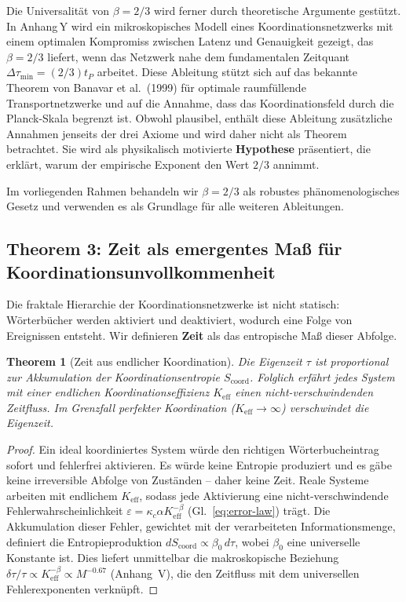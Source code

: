 \documentclass[12pt,a4paper]{article}
\newtheorem{theorem}{Theorem}[section]
\begin{document}
	Die Universalität von \(\beta = 2/3\) wird ferner durch theoretische Argumente gestützt.  In Anhang Y wird ein mikroskopisches Modell eines Koordinationsnetzwerks mit einem optimalen Kompromiss zwischen Latenz und Genauigkeit gezeigt, das \(\beta = 2/3\) liefert, wenn das Netzwerk nahe dem fundamentalen Zeitquant \(\Delta\tau_{\min} = (2/3) t_P\) arbeitet.  Diese Ableitung stützt sich auf das bekannte Theorem von Banavar et al.\ (1999) für optimale raumfüllende Transportnetzwerke und auf die Annahme, dass das Koordinationsfeld durch die Planck-Skala begrenzt ist.  Obwohl plausibel, enthält diese Ableitung zusätzliche Annahmen jenseits der drei Axiome und wird daher nicht als Theorem betrachtet.  Sie wird als physikalisch motivierte \textbf{Hypothese} präsentiert, die erklärt, warum der empirische Exponent den Wert \(2/3\) annimmt.
	
	Im vorliegenden Rahmen behandeln wir \(\beta = 2/3\) als robustes phänomenologisches Gesetz und verwenden es als Grundlage für alle weiteren Ableitungen.
	
	\subsection{Theorem 3: Zeit als emergentes Maß für Koordinationsunvollkommenheit}
	\label{subsec:time-emergence}
	
	Die fraktale Hierarchie der Koordinationsnetzwerke ist nicht statisch: Wörterbücher werden aktiviert und deaktiviert, wodurch eine Folge von Ereignissen entsteht.  Wir definieren
	\textbf{Zeit} als das entropische Maß dieser Abfolge.
	
	\begin{theorem}[Zeit aus endlicher Koordination]
		\label{thm:time}
		Die Eigenzeit \(\tau\) ist proportional zur Akkumulation der Koordinationsentropie \(S_{\mathrm{coord}}\).  Folglich erfährt jedes System mit einer endlichen Koordinationseffizienz \(K_{\mathrm{eff}}\) einen nicht-verschwindenden Zeitfluss.  Im Grenzfall perfekter Koordination (\(K_{\mathrm{eff}} \to \infty\)) verschwindet die Eigenzeit.
	\end{theorem}
	
	\begin{proof}
		Ein ideal koordiniertes System würde den richtigen Wörterbucheintrag sofort und fehlerfrei aktivieren.  Es würde keine Entropie produziert und es gäbe keine irreversible Abfolge von Zuständen – daher keine Zeit.  Reale Systeme arbeiten mit endlichem \(K_{\mathrm{eff}}\), sodass jede Aktivierung eine nicht-verschwindende Fehlerwahrscheinlichkeit \(\varepsilon = \kappa_c \alpha K_{\mathrm{eff}}^{-\beta}\) (Gl.~\ref{eq:error-law}) trägt.  Die Akkumulation dieser Fehler, gewichtet mit der verarbeiteten Informationsmenge, definiert die Entropieproduktion \(dS_{\mathrm{coord}} \propto \beta_0 \, d\tau\), wobei \(\beta_0\) eine universelle Konstante ist.  Dies liefert unmittelbar die makroskopische Beziehung \(\delta\tau/\tau \propto K_{\mathrm{eff}}^{-\beta} \propto M^{-0.67}\) (Anhang~V), die den Zeitfluss mit dem universellen Fehlerexponenten verknüpft.
	\end{proof}
	
\end{document}
